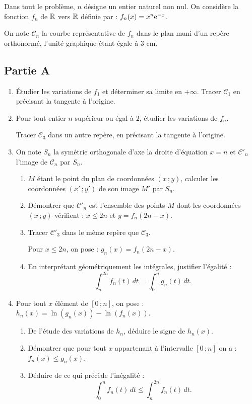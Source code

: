 Dans tout le problème, $n$ désigne un entier naturel non nul. On considère la fonction $f_n$ de $\mathbb{R}$ vers $\mathbb{R}$ définie par : $f_n(x)=x^n\mathrm{e}^{-x}$.

On note $\mathscr{C}_n$ la courbe représentative de $f_n$ dans le plan muni d'un repère orthonormé, l'unité graphique étant égale à $3$ cm.

\subsection*{Partie A}

\begin{enumerate}
	\item Étudier les variations de $f_1$ et déterminer sa limite en $+\infty$. Tracer $\mathscr{C}_1$ en précisant la tangente à l'origine.
	\item Pour tout entier $n$ supérieur ou égal à $2$, étudier les variations de $f_n$.

	Tracer $\mathscr{C}_3$ dans un autre repère, en précisant la tangente à l'origine.
	\item On note $S_n$ la symétrie orthogonale d'axe la droite d'équation $x=n$ et $\mathscr{C}'_n$ l'image de $\mathscr{C}_n$ par $S_n$.
	\begin{enumerate}
		\item $M$ étant le point du plan de coordonnées $(x\,;y)$, calculer les coordonnées $(x'\,;y')$ de son image $M'$ par $S_n$.
		\item Démontrer que $\mathscr{C}'_n$ est l'ensemble des points $M$ dont les coordonnées $(x\,;y)$ vérifient : $x\leqslant2n$ et $y=f_n(2n-x)$.
		\item Tracer $\mathscr{C}'_3$ dans le même repère que $\mathscr{C}_3$.

		Pour $x\leqslant2n$, on pose : $g_n(x)=f_n(2n-x)$.
		\item En interprétant géométriquement les intégrales, justifier l'égalité :
		\[
		\int_n^{2n} f_n(t)\,dt = \int_0^n g_n(t)\,dt.
		\]
	\end{enumerate}
	\item Pour tout $x$ élément de $[0\,;n]$, on pose : $h_n(x)=\ln(g_n(x))-\ln(f_n(x))$.
	\begin{enumerate}
		\item De l'étude des variations de $h_n$, déduire le signe de $h_n(x)$.
		\item Démontrer que pour tout $x$ appartenant à l'intervalle $[0\,;n]$ on a : $f_n(x)\leqslant g_n(x)$.
		\item Déduire de ce qui précède l'inégalité :
		\[
		\int_0^n f_n(t)\,dt \leqslant \int_n^{2n} f_n(t)\,dt.
		\]
	\end{enumerate}
\end{enumerate}

